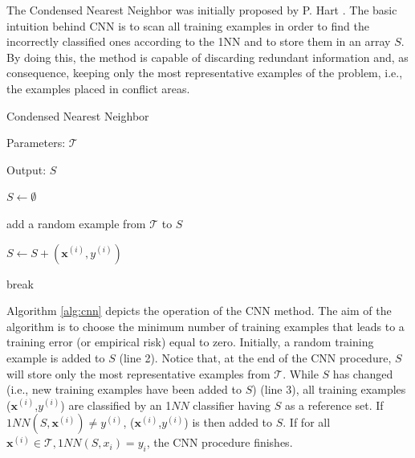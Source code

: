 The Condensed Nearest Neighbor was initially proposed by P. Hart \cite{cnn:68}. The basic intuition behind CNN is to scan all training examples in order to find the incorrectly classified ones according to the 1NN and to store them in an array $S$. By doing this, the method is capable of discarding redundant information and, as consequence, keeping only the most representative examples of the problem, i.e., the examples placed in conflict areas. 


\vspace{0.2cm}

\begin{algorithm}[H]
    \label{alg:cnn}
    \caption{Condensed Nearest Neighbor}
    
    Parameters: $\mathcal{T}$
    
    Output: $S$
    
    \begin{algorithmic}[1] 
    
    \STATE $S \gets \emptyset$
   
    \STATE add a random example from $\mathcal{T}$ to $S$
   
        
    
                
                \STATE $S \gets S + (\mathbf{x}^{(i)}, y^{(i)})$
                
                \STATE break
                    
            \ENDIF
        \ENDFOR
        
    \ENDWHILE
  
  \end{algorithmic}
  
\end{algorithm}

\vspace{0.2cm}

Algorithm \ref{alg:cnn} depicts the operation of the CNN method. The aim of the algorithm is to choose the minimum number of training examples that leads to a training error (or empirical risk) equal to zero. Initially, a random training example is added to $S$ (line 2). Notice that, at the end of the CNN procedure, $S$ will store only the most representative examples from $\mathcal{T}$. While $S$ has changed (i.e., new training examples have been added to $S$) (line 3), all training examples ($\mathbf{x}^{(i)}$,$y^{(i)}$) are classified by an 1$NN$ classifier having $S$ as a reference set. If $1NN(S, \mathbf{x}^{(i)}) \neq y^{(i)}$, ($\mathbf{x}^{(i)}$,$y^{(i)}$) is then added to $S$. If for all $\mathbf{x}^{(i)} \in \mathcal{T}, 1NN(S, x_i) = y_i$, the CNN procedure finishes. 

